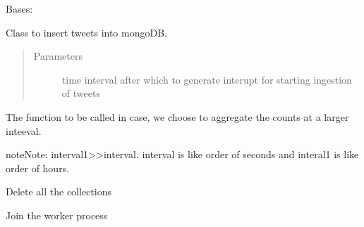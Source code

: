\documentclass[letterpaper,10pt,english]{sphinxmanual}
\begin{document}
\begin{fulllineitems}
\label{\detokenize{mongoDB_data_ingestion:ingest_raw.Ingest}}
Bases: 

Class to insert tweets into mongoDB.
\begin{quote}\begin{description}
\item[{Parameters}] \leavevmode
{} \textendash{} time interval after which to generate interupt for starting ingestion of tweets

\end{description}\end{quote}

\begin{fulllineitems}
\label{\detokenize{mongoDB_data_ingestion:ingest_raw.Ingest.aggregate}}
The function to be called in case, we choose to aggregate the counts at a larger inteeval.

\begin{sphinxadmonition}{note}{Note:}
interval1\textgreater{}\textgreater{}interval. interval is like order of seconds and interal1 is like order of hours.
\end{sphinxadmonition}

\end{fulllineitems}


\begin{fulllineitems}
\label{\detokenize{mongoDB_data_ingestion:ingest_raw.Ingest.clear_db}}
Delete all the collections

\end{fulllineitems}


\begin{fulllineitems}
\label{\detokenize{mongoDB_data_ingestion:ingest_raw.Ingest.exit}}
Join the worker process

\end{fulllineitems}



\end{fulllineitems}
\end{document}
